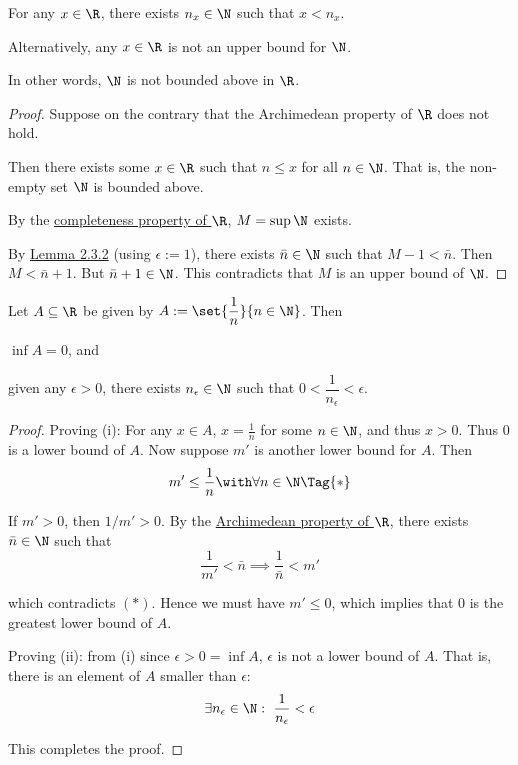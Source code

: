 \label{fbc2289}

For any $x\in\R$, there exists $n_x\in\N$ such that $x<n_x$.

Alternatively, any $x\in\R$ is not an upper bound for $\N$.

In other words, $\N$ is not bounded above in $\R$.

\begin{proof}
  Suppose on the contrary that the Archimedean property of $\R$ does not hold.

  Then there exists some $x\in\R$ such that $n\leq x$ for all $n\in\N$. That is,
  the non-empty set $\N$ is bounded above.

  By the \href{f330cf9}{completeness property of $\R$}, $M=\sup\N$ exists.

  By \href{f77f162}{Lemma 2.3.2} (using $\epsilon:=1$), there exists $\bar
  n\in\N$ such that $M-1<\bar n$. Then $M<\bar n+1$. But $\bar n+1\in\N$. This
  contradicts that $M$ is an upper bound of $\N$.
\end{proof}

\label{d845856}

Let $A\subseteq\R$ be given by $A:=\set{\dfrac1n}{n\in\N}$. Then
\begin{enumerati}
  \item $\inf A=0$, and
  \item given any $\epsilon>0$, there exists $n_\epsilon\in\N$ such that
  $0<\dfrac1{n_\epsilon}<\epsilon$.
\end{enumerati}

\begin{proof}
  Proving (i): For any $x\in A$, $x=\frac1n$ for some $n\in\N$, and thus $x>0$.
  Thus $0$ is a lower bound of $A$. Now suppose $m'$ is another lower bound for
  $A$. Then
  \begin{equation*}
    m'\leq\frac1n\with\forall n\in\N\Tag{*}
  \end{equation*}

  If $m'>0$, then $1/m'>0$. By the \href{fbc2289}{Archimedean property of $\R$},
  there exists $\bar n\in\N$ such that
  $$
    \frac1{m'}<\bar n\implies\frac1{\bar n}<m'
  $$

  which contradicts $(*)$. Hence we must have $m'\leq0$, which implies that 0 is
  the greatest lower bound of $A$.

  Proving (ii): from (i) since $\epsilon>0=\inf A$, $\epsilon$ is not a lower
  bound of $A$. That is, there is an element of $A$ smaller than $\epsilon$:
  $$
    \exists n_\epsilon\in\N:\ \frac1{n_\epsilon}<\epsilon
  $$

  This completes the proof.
\end{proof}

